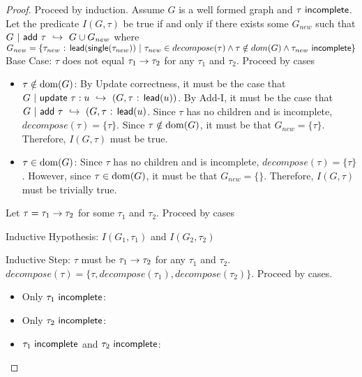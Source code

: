 \begin{proof}
     Proceed by induction.
     Assume $G$ is a well formed graph and $\tau ~ \normalfont\textsf{incomplete}$. Let the predicate $I(G, \tau)$ be true if and only if there exists some $G_{new}$ such that $G~|~\normalfont\textsf{add}~\tau ~\hookrightarrow~ G \cup G_{new}$ where  $G_{new} = \{ \tau_{new}\normalfont\textsf{ : }\normalfont\textsf{lead}(\normalfont\textsf{single}(\tau_{new})) ~|~ \tau_{new} \in decompose(\tau) \wedge \tau \notin dom(G) \wedge \tau_{new} ~ \normalfont\textsf{incomplete} \}$\\
     
     Base Case: $\tau$ does not equal $\tau_1 \to \tau_2$ for any $\tau_1$ and $\tau_2$. Proceed by cases
     \begin{itemize}
         \item $\tau \notin \operatorname{dom}(G)$: By Update correctness, it must be the case that $G~|~\normalfont\textsf{update}~\tau:u ~\hookrightarrow~ (G, \tau\normalfont\textsf{ : }\normalfont\textsf{lead}(u))$. By Add-I, it must be the case that $G~|~\normalfont\textsf{add}~\tau ~\hookrightarrow~ (G, \tau\normalfont\textsf{ : }\normalfont\textsf{lead}(u)$.
         Since $\tau$ has no children and is incomplete, $decompose(\tau) = \{ \tau \}$. Since $\tau \notin \operatorname{dom}(G)$, it must be that $G_{new} = \{ \tau \}$. Therefore, $I(G, \tau)$ must be true.
         \item $\tau \in \operatorname{dom}(G)$: Since $\tau$ has no children and is incomplete, $decompose(\tau) = \{ \tau \}$. However, since $\tau \in \operatorname{dom}(G)$, it must be that $G_{new} = \{ \}$. Therefore, $I(G, \tau)$ must be trivially true.
     \end{itemize}

    Let $\tau = \tau_1 \to \tau_2$ for some $\tau_1$ and $\tau_2$. Proceed by cases
    
    Inductive Hypothesis: $I(G_1, \tau_1)$ and $I(G_2, \tau_2)$
    
    Inductive Step: $\tau$ must be $\tau_1 \to \tau_2$ for any $\tau_1$ and $\tau_2$. $decompose(\tau) = \{ \tau, decompose(\tau_1), decompose(\tau_2) \}$. Proceed by cases.

    \begin{itemize}
        \item Only $\tau_1 ~ \normalfont\textsf{incomplete}$: 
        \item Only $\tau_2 ~ \normalfont\textsf{incomplete}$: 
        \item $\tau_1 ~ \normalfont\textsf{incomplete}$ and $\tau_2 ~ \normalfont\textsf{incomplete}$: 
    \end{itemize}
    
\end{proof}

